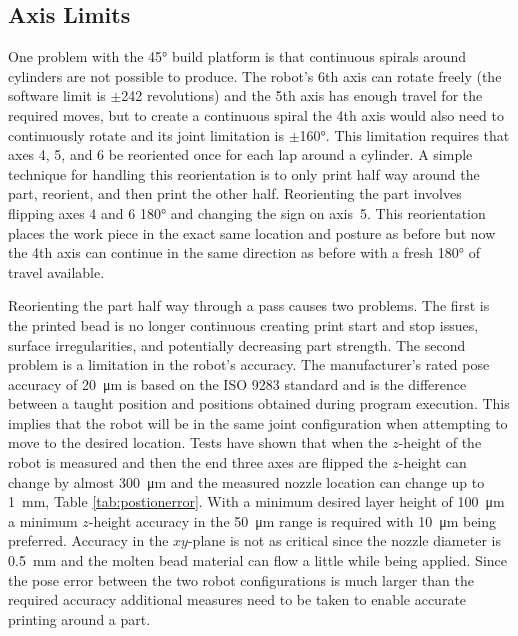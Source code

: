 \documentclass[main.tex]{subfiles}
\begin{document}
\subsection{Axis Limits}
One problem with the \ang{45} build platform is that continuous spirals around cylinders are not possible to produce.
The robot's 6th axis can rotate freely (the software limit is $\pm$242 revolutions) and the 5th axis has enough travel for the required moves, but to create a continuous spiral the 4th axis would also need to continuously rotate and its joint limitation is $\pm$\ang{160}.
This limitation requires that axes 4, 5, and 6 be reoriented once for each lap around a cylinder.
A simple technique for handling this reorientation is to only print half way around the part, reorient, and then print the other half.
Reorienting the part involves flipping axes 4 and 6 \ang{180} and changing the sign on axis~5. This reorientation places the work piece in the exact same location and posture as before but now the 4th axis can continue in the same direction as before with a fresh \ang{180} of travel available.

Reorienting the part half way through a pass causes two problems.
The first is the printed bead is no longer continuous creating print start and stop issues, surface irregularities, and potentially decreasing part strength.
The second problem is a limitation in the robot's accuracy.
The manufacturer's rated pose accuracy of \SI{20}{\micro m} is based on the ISO 9283  standard and is the difference between a taught position and positions obtained during program execution.
This implies that the robot will be in the same joint configuration when attempting to move to the desired location.
Tests have shown that when the $z$\nobreakdash-height of the robot is measured and then the end three axes are flipped the $z$\nobreakdash-height can change by almost \SI{300}{\micro m} and the measured nozzle location can change up to \SI{1}{mm}, Table \ref{tab:postionerror}.
With a minimum desired layer height of \SI{100}{\micro m} a minimum $z$\nobreakdash-height accuracy in the \SI{50}{\micro m} range is required with \SI{10}{\micro m} being preferred.
Accuracy in the $xy$\nobreakdash-plane is not as critical since the nozzle diameter is \SI{0.5}{mm} and the molten bead material can flow a little while being applied.
Since the pose error between the two robot configurations is much larger than the required accuracy additional measures need to be taken to enable accurate printing around a part.
\end{document}

